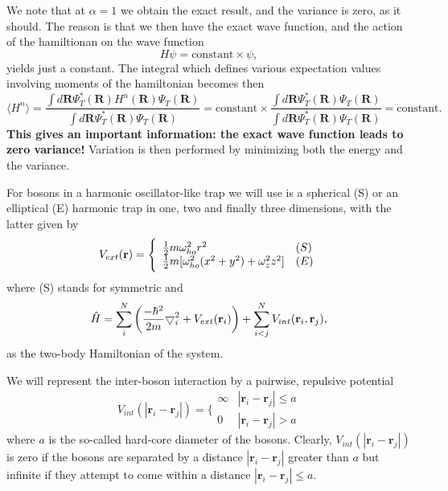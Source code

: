 \documentclass[%
oneside,                 %
final,                   %
10pt]{article}
\begin{document}
\noindent
We note that at $\alpha=1$ we obtain the exact
result, and the variance is zero, as it should. The reason is that 
we then have the exact wave function, and the action of the hamiltionan
on the wave function
\[
   H\psi = \mathrm{constant}\times \psi,
\]
yields just a constant. The integral which defines various 
expectation values involving moments of the hamiltonian becomes then
\[
   \langle H^n \rangle =
   \frac{\int d\bm{R}\Psi^{\ast}_T(\bm{R})H^n(\bm{R})\Psi_T(\bm{R})}
        {\int d\bm{R}\Psi^{\ast}_T(\bm{R})\Psi_T(\bm{R})}=
\mathrm{constant}\times\frac{\int d\bm{R}\Psi^{\ast}_T(\bm{R})\Psi_T(\bm{R})}
        {\int d\bm{R}\Psi^{\ast}_T(\bm{R})\Psi_T(\bm{R})}=\mathrm{constant}.
\]
\textbf{This gives an important information: the exact wave function leads to zero variance!}
Variation is then performed by minimizing both the energy and the variance.

For bosons in a harmonic oscillator-like  trap we will use is a spherical (S)
 or an elliptical (E) harmonic trap in one, two and finally three
 dimensions, with the latter given by
 \begin{equation}
 V_{ext}(\mathbf{r}) = \Bigg\{
 \begin{array}{ll}
	 \frac{1}{2}m\omega_{ho}^2r^2 & (S)\\
 \strut
	 \frac{1}{2}m[\omega_{ho}^2(x^2+y^2) + \omega_z^2z^2] & (E)
 \label{trap_eqn}
 \end{array}
 \end{equation}
where (S) stands for symmetric and 
\begin{equation}
     \hat{H} = \sum_i^N \left(
	 \frac{-\hbar^2}{2m}
	 { \bigtriangledown }_{i}^2 +
	 V_{ext}({\bf{r}}_i)\right)  +
	 \sum_{i<j}^{N} V_{int}({\bf{r}}_i,{\bf{r}}_j),
\end{equation}
as the two-body Hamiltonian of the system.  

 We will represent the inter-boson interaction by a pairwise, repulsive potential
\begin{equation}
 V_{int}(|\mathbf{r}_i-\mathbf{r}_j|) =  \Bigg\{
 \begin{array}{ll}
	 \infty & {|\mathbf{r}_i-\mathbf{r}_j|} \leq {a}\\
	 0 & {|\mathbf{r}_i-\mathbf{r}_j|} > {a}
 \end{array}
 \end{equation}
 where $a$ is the so-called hard-core diameter of the bosons.
 Clearly, $V_{int}(|\mathbf{r}_i-\mathbf{r}_j|)$ is zero if the bosons are
 separated by a distance $|\mathbf{r}_i-\mathbf{r}_j|$ greater than $a$ but
 infinite if they attempt to come within a distance $|\mathbf{r}_i-\mathbf{r}_j| \leq a$.
\end{document}
